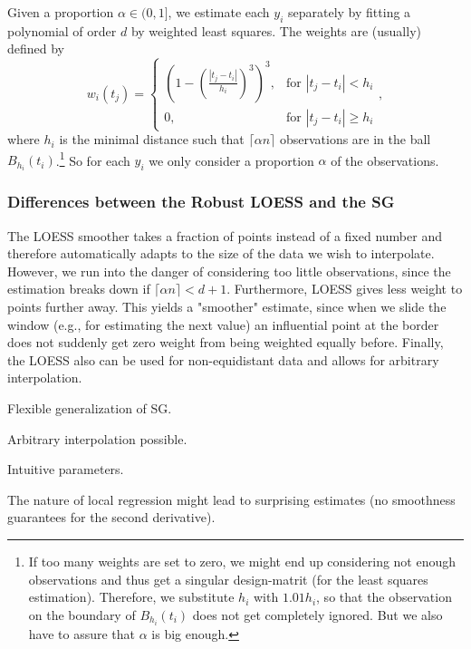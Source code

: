 		Given a proportion $\alpha \in (0,1]$, we estimate each $y_i$ separately by fitting a polynomial of order $d$ by weighted least squares. The weights are (usually) defined by
		$$w_i(t_j)=\begin{cases}
				\left(1-\left(\frac{|t_j-t_i|}{h_i}\right)^{3}\right)^{3}, & \text{for } |t_j-t_i|<h_i           \\
				0,                                                   & \text{for } |t_j-t_i| \geqslant h_i
			\end{cases} ,$$
		where $h_i$ is the minimal distance such that $\lceil \alpha n\rceil$ observations are in the ball $B_{h_i}(t_i)$.\footnote{\label{footnote:LOESS}If too many weights are set to zero, we might end up considering not enough observations and thus get a singular design-matrit (for the least squares estimation). Therefore, we substitute $h_i$ with $1.01 h_i$, so that the observation on the boundary of $B_{h_i}(t_i)$ does not get completely ignored. But we also have to assure that $\alpha$ is big enough.} So for each $y_i$ we only consider a proportion $\alpha$ of the observations.

		\subsubsection{Differences between the Robust LOESS and the SG}
		The LOESS smoother takes a fraction of points instead of a fixed number and therefore automatically adapts to the size of the data we wish to interpolate. However, we run into the danger of considering too little observations, since the estimation breaks down if $\lceil \alpha n\rceil < d+1$.
		Furthermore, LOESS gives less weight to points further away. This yields a "smoother" estimate, since when we slide the window (e.g., for estimating the next value) an influential point at the border does not suddenly get zero weight from being weighted equally before.
		Finally, the LOESS also can be used for non-equidistant data and allows for arbitrary interpolation.

		\begin{my_pros_cons_table}{
				\item Flexible generalization of SG.
				\item Arbitrary interpolation possible.
				\item Intuitive parameters.
			}{
				\item The nature of local regression might lead to surprising estimates (no smoothness guarantees for the second derivative).
			}
		\end{my_pros_cons_table}


